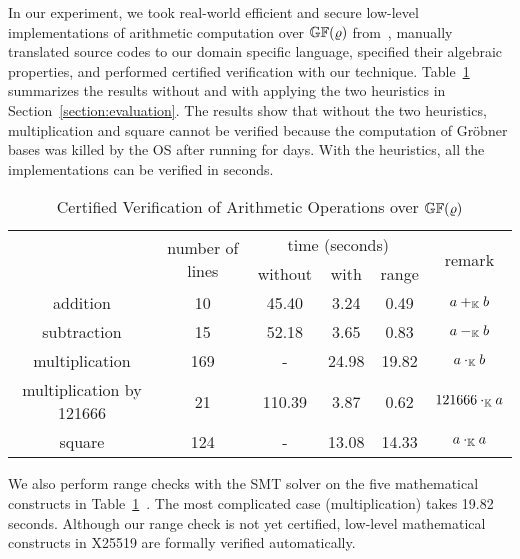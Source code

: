 
In our experiment, we took real-world efficient and secure
low-level implementations of arithmetic computation over
$\mathbb{GF}(\varrho)$ from~\cite{BDL+:11:HSHSS,BDL+:12:HSHSS}, 
manually translated source
codes to our domain specific language, specified their algebraic
properties, and performed certified verification with our technique. 
Table~\ref{table:arithmetic-operations} summarizes the results
without and with applying the two heuristics in Section~\ref{section:evaluation}.
The results show that without the two heuristics, multiplication and square
cannot be verified because the computation of Gr\"obner bases was killed by the OS
after running for days.
With the heuristics, all the implementations can be verified in seconds.



\vspace{-1em}
\begin{table}[ht]
  \caption{Certified Verification of Arithmetic Operations over
    $\mathbb{GF}(\varrho)$}
  \centering
  \begin{tabular}{|c|c|c|c|c|c|}
    \hline
    \multirow{2}{*}{} & \multirow{2}{*}{number of lines} & \multicolumn{3}{|c|}{time (seconds)} & \multirow{2}{*}{remark} \\ \cline{3-5}
    & & without & with & range & \\
    \hline
    addition                 & 10  & 45.40  & 3.24   & 0.49   & $a +_{\mathbb{K}} b$ \\
    \hline
    subtraction              & 15  & 52.18  & 3.65   & 0.83   & $a -_{\mathbb{K}} b$ \\
    \hline
    multiplication           & 169 & -      & 24.98  & 19.82 & $a \cdot_{\mathbb{K}} b$\\
    \hline
    multiplication by 121666 & 21  & 110.39 & 3.87   & 0.62   & $121666 \cdot_{\mathbb{K}} a$\\
    \hline
    square                   & 124 & -      & 13.08  & 14.33 & $a \cdot_{\mathbb{K}} a$\\
    \hline
  \end{tabular}
  \label{table:arithmetic-operations}
\end{table}
\vspace{-1em}


We also perform range checks with the SMT solver \boolector on the
five mathematical constructs in 
Table~\ref{table:arithmetic-operations}~\cite{boolector}. The most complicated case
(multiplication) takes 19.82 seconds.
Although our range check is not yet certified, low-level
mathematical constructs in X25519 are formally verified automatically.

